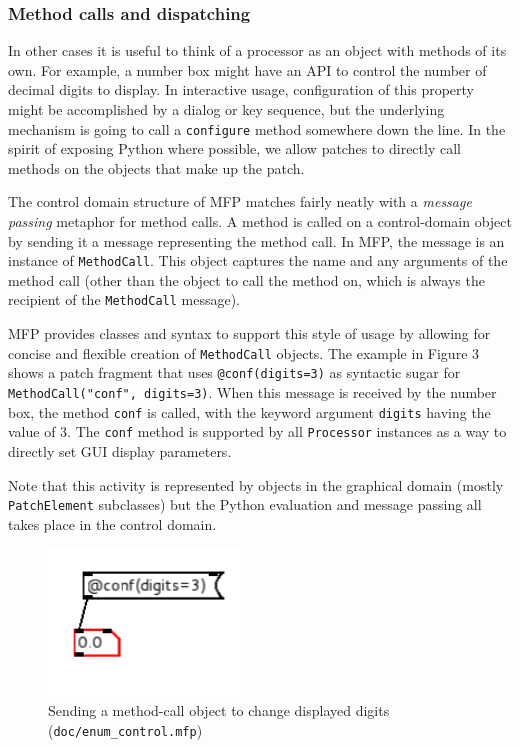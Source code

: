 \documentclass[11pt,a4paper]{article}
\begin{document}
\subsubsection{Method calls and dispatching}

In other cases it is useful to think of a processor as an object with
methods of its own.  For example, a number box might have an API to control
the number of decimal digits to display.  In interactive usage,
configuration of this property might be accomplished by a dialog or key
sequence, but the underlying mechanism is going to call a
\texttt{configure} method somewhere down the line.  In the spirit of
exposing Python where possible, we allow patches to directly call methods
on the objects that make up the patch.  

The control domain structure of MFP matches fairly neatly with a
\emph{message passing} metaphor for method calls.  A method is called on a
control-domain object by sending it a message representing the method call.
In MFP, the message is an instance of \texttt{MethodCall}.  This object
captures the name and any arguments of the method call (other than the
object to call the method on, which is always the recipient of the
\texttt{MethodCall} message). 

MFP provides classes and syntax to support this style of usage by allowing
for concise and flexible creation of \texttt{MethodCall} objects.  The
example in Figure 3 shows a patch fragment that uses
\texttt{@conf(digits=3)} as syntactic sugar for \texttt{MethodCall("conf",
digits=3)}.  When this message is received by the number box, the method
\texttt{conf} is called, with the keyword argument \texttt{digits} having
the value of 3.  The \texttt{conf} method is supported by all
\texttt{Processor} instances as a way to directly set GUI display
parameters.  

Note that this activity is represented by objects in the graphical domain
(mostly \texttt{PatchElement} subclasses) but the Python evaluation and
message passing all takes place in the control domain. 

\begin{figure}
    \centering\includegraphics[width=2in]{enum_control.png}
    \caption{Sending a method-call object to change displayed digits 
    (\texttt{doc/enum\_control.mfp})}
\end{figure}
\end{document}
